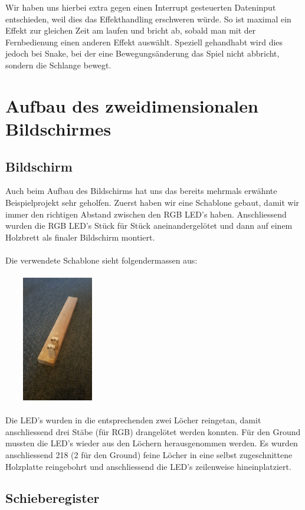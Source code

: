 \documentclass[12pt,a4paper]{article}
\begin{document}
Wir haben uns hierbei extra gegen einen Interrupt gesteuerten Dateninput entschieden, weil dies das Effekthandling erschweren würde. So ist maximal ein Effekt zur gleichen Zeit am laufen und bricht ab, sobald man mit der Fernbedienung einen anderen Effekt auswählt. Speziell gehandhabt wird dies jedoch bei Snake, bei der eine Bewegungsänderung das Spiel nicht abbricht, sondern die Schlange bewegt.
\newpage
\section{Aufbau des zweidimensionalen Bildschirmes}

\subsection{Bildschirm}

Auch beim Aufbau des Bildschirms hat uns das bereits mehrmals erwähnte Beispielprojekt sehr geholfen.
Zuerst haben wir eine Schablone gebaut, damit wir immer den richtigen Abstand zwischen den RGB LED's haben.
Anschliessend wurden die RGB LED's Stück für Stück aneinandergelötet und dann auf einem Holzbrett als finaler Bildschirm
montiert.\\\\
Die verwendete Schablone sieht folgendermassen aus: \\\\
\includegraphics[width=0.35\textwidth, height=5.5cm]{montagehilfe.jpg} \\\\
Die LED's wurden in die entsprechenden zwei Löcher reingetan, damit anschliessend drei Stäbe (für RGB) drangelötet werden konnten.
Für den Ground mussten die LED's wieder aus den Löchern herausgenommen werden. Es wurden anschliessend 218 (2 für den Ground) feine Löcher in eine selbst
zugeschnittene Holzplatte reingebohrt und anschliessend die LED's zeilenweise hineinplatziert.

\subsection{Schieberegister}
\end{document}

